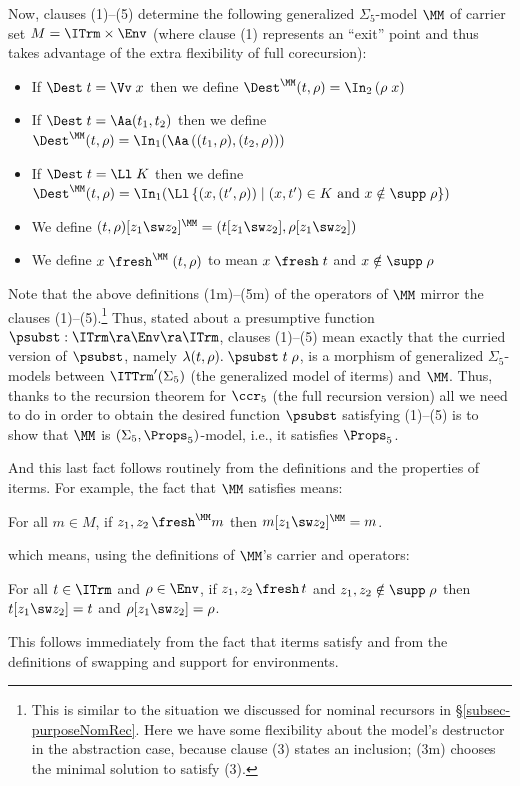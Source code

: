 Now, clauses (1)--(5) determine the following generalized $\Sigma_5$-model $\MM$ of carrier set $M = \ITrm \times \Env$ (where clause (1) represents an ``exit'' point and thus takes advantage of the extra flexibility of full corecursion):
%
\begin{itemize}
	\item[(1m)] If $\Dest\;t = \Vv\;x$ then we define $\Dest^\MM(t,\rho) = \In_2\,(\rho\;x)$
	\item[(2m)] 
	If $\Dest\;t = \Aa(t_1,t_2)$ then we define 
	$\Dest^\MM (t,\rho) = \In_1(\Aa\,((t_1,\rho),(t_2,\rho)))$
	\item[(3m)] If $\Dest\;t = \Ll\;K$ then we define 
	$\Dest^\MM(t,\rho) =
	\In_1(\Ll\,\{ (x,(t',\rho)) \mid   (x,t') \in K \mbox{ and } x\notin\supp\;\rho\})$ 
	\item[(4m)] We define $(t,\rho)[z_1\sw z_2]^\MM = 
	(t[z_1\sw z_2],\rho[z_1\sw z_2])$  
	\item[(5m)] We define $x\;\fresh^\MM\;(t,\rho)$ 
	to mean 
	$x\;\fresh\;t$ and $x\notin\supp\;\rho$	
\end{itemize}
%

Note that the above definitions (1m)--(5m) of the operators of $\MM$ mirror the clauses (1)--(5).\footnote{This is similar to the situation we discussed for nominal recursors in \S\ref{subsec-purposeNomRec}.
Here we have some flexibility about the model's destructor in the abstraction case, because clause (3) states an inclusion; (3m) chooses the minimal solution to satisfy   (3).} Thus, stated about a presumptive function $\psubst : \ITrm \ra  \Env \ra \ITrm$, clauses (1)--(5) 
mean exactly that the curried version of $\psubst$, namely 
$\lambda (t,\rho).\;\psubst\;t\;\rho$, is a morphism of generalized $\Sigma_5$-models 
between $\ITTrm'(\Sigma_5)$ (the generalized model of iterms) and $\MM$. Thus, thanks to the recursion theorem for $\ccr_5$ (the full recursion version) 
all we need to do in order to obtain the desired function $\psubst$ satisfying (1)--(5) is to show that $\MM$ is $(\Sigma_5,\Props_5)$-model, i.e., it satisfies $\Props_5$. 

And this last fact follows routinely from the definitions and the properties of iterms. For example, the fact that $\MM$ satisfies \SwFr{} means: 
\begin{center}
For all $m\in M$, if $z_1 ,z_2\,\fresh^\MM m$ then 
$m[z_1\sw z_2]^\MM = m$. 
\end{center}
which means, using the definitions of $\MM$'s carrier and operators:
\begin{center}
	For all $t\in \ITrm$ and $\rho\in\Env$, if $z_1 ,z_2\,\fresh\,t$ and $z_1,z_2\notin\supp\;\rho$ 
	then 
	$t[z_1\sw z_2] = t$ and $\rho[z_1\sw z_2] = \rho$. 
\end{center}
%
This follows immediately from the fact that iterms satisfy \SwFr{} and from the definitions of swapping and support for environments. 

